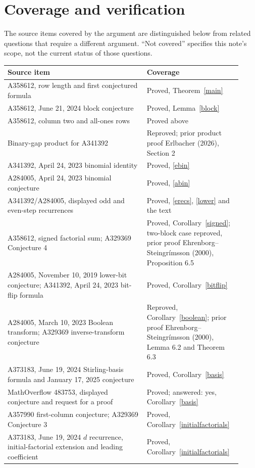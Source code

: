 \documentclass[11pt]{article}
\begin{document}
\section{Coverage and verification}
The source items covered by the argument are distinguished below from
related questions that require a different argument. ``Not covered''
specifies this note's scope, not the current status of those questions.

\begingroup\small
\begin{longtable}{>{\raggedright\arraybackslash}p{0.56\linewidth}>{\raggedright\arraybackslash}p{0.36\linewidth}}
\toprule
Source item & Coverage\\\midrule
A358612, row length and first conjectured formula & Proved, Theorem~\ref{main}\\
A358612, June 21, 2024 block conjecture & Proved, Lemma~\ref{block}\\
A358612, column two and all-ones rows & Proved above\\
Binary-gap product for A341392 & Reproved; prior product proof Erlbacher (2026), Section 2\\
A341392, April 24, 2023 binomial identity & Proved, \eqref{ebin}\\
A284005, April 24, 2023 binomial conjecture & Proved, \eqref{abin}\\
A341392/A284005, displayed odd and even-step recurrences & Proved, \eqref{erecs}, \eqref{lower} and the text\\
A358612, signed factorial sum; A329369 Conjecture 4 & Proved, Corollary~\ref{signed}; two-block case reproved, prior proof Ehrenborg--Steingr\'imsson (2000), Proposition 6.5\\
A284005, November 10, 2019 lower-bit conjecture; A341392, April 24, 2023 bit-flip formula & Proved, Corollary~\ref{bitflip}\\
A284005, March 10, 2023 Boolean transform; A329369 inverse-transform conjecture & Reproved, Corollary~\ref{boolean}; prior proof Ehrenborg--Steingr\'imsson (2000), Lemma 6.2 and Theorem 6.3\\
A373183, June 19, 2024 Stirling-basis formula and January 17, 2025 conjecture & Proved, Corollary~\ref{basis}\\
MathOverflow 483753, displayed conjecture and request for a proof & Proved; answered: yes, Corollary~\ref{basis}\\
A357990 first-column conjecture; A329369 Conjecture 3 & Proved, Corollary~\ref{initialfactorials}\\
A373183, June 19, 2024 $d$ recurrence, initial-factorial extension and leading coefficient & Proved, Corollary~\ref{initialfactorials}\\

\end{longtable}
\end{document}
